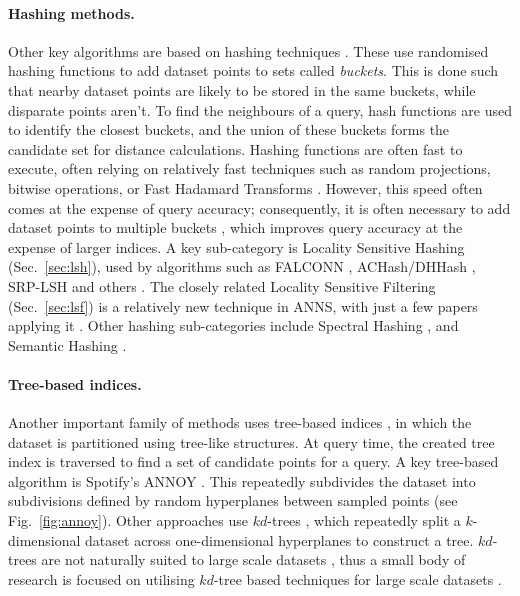 \documentclass{article}
\begin{document}
\paragraph{Hashing methods.}

Other key algorithms are based on hashing techniques \cite{pham2022falconn++,pham2021simple,cheng2024robust,pan2011fast,becker2016new}. These use randomised hashing functions to add dataset points to sets called \emph{buckets}. This is done such that nearby dataset points are likely to be stored in the same buckets, while disparate points aren't. To find the neighbours of a query, hash functions are used to identify the closest buckets, and the union of these buckets forms the candidate set for distance calculations. Hashing functions are often fast to execute, often relying on relatively fast techniques such as random projections, bitwise operations, or Fast Hadamard Transforms \cite{jafari2021survey, pham2022falconn++}. However, this speed often comes at the expense of query accuracy; consequently, it is often necessary to add dataset points to multiple buckets \cite{xu2011complementary,lv2007multi}, which improves query accuracy at the expense of larger indices. A key sub-category is Locality Sensitive Hashing (Sec.~\ref{sec:lsh}), used by algorithms such as FALCONN \cite{andoni2015practical}, ACHash/DHHash \cite{dasgupta2011fast}, SRP-LSH \cite{ji2012super} and others \cite{pan2011fast,gorisse2011locality,huang2015query,wang2014hashing,jafari2021survey}. The closely related Locality Sensitive Filtering (Sec.~\ref {sec:lsf}) is a relatively new technique in ANNS, with just a few papers applying it \cite{pham2022falconn++, christiani2017framework}. Other hashing sub-categories include Spectral Hashing \cite{weiss2008spectral}, and Semantic Hashing \cite{salakhutdinov2009semantic}. 

\paragraph{Tree-based indices.}

Another important family of methods uses tree-based indices \cite{hyvonen2016fast, jaasaari2019efficient, ram2019revisiting, sun2023soar, bernhardsson2015annoy}, in which the dataset is partitioned using tree-like structures. At query time, the created tree index is traversed to find a set of candidate points for a query. A key tree-based algorithm is Spotify's ANNOY \cite{bernhardsson2015annoy}. This repeatedly subdivides the dataset into subdivisions defined by random hyperplanes between sampled points (see Fig.~\ref{fig:annoy}). Other approaches use $kd$-trees \cite{ram2019revisiting,chen2019fast,panigrahy2008improved}, which repeatedly split a $ k$-dimensional dataset across one-dimensional hyperplanes to construct a tree. $kd$-trees are not naturally suited to large scale datasets \cite{panigrahy2008improved}, thus a small body of research is focused on utilising $kd$-tree based techniques for large scale datasets \cite{panigrahy2008improved,avrithis2016high,ram2019revisiting}.
\end{document}
